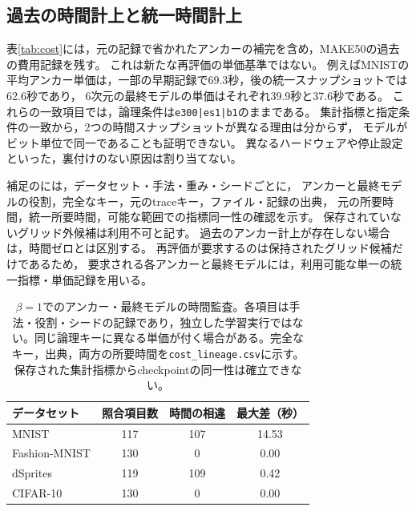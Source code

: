 \documentclass[11pt,a4paper]{ltjsarticle}
\begin{document}
\subsection{過去の時間計上と統一時間計上}\label{app:timing}
表\ref{tab:cost}には，元の記録で省かれたアンカーの補完を含め，MAKE50の過去の費用記録を残す。
これは新たな再評価の単価基準ではない。
例えばMNISTの平均アンカー単価は，一部の早期記録で69.3秒，後の統一スナップショットでは62.6秒であり，
6次元の最終モデルの単価はそれぞれ39.9秒と37.6秒である。
これらの一致項目では，論理条件は\texttt{e300|es1|b1}のままである。
集計指標と指定条件の一致から，2つの時間スナップショットが異なる理由は分からず，
モデルがビット単位で同一であることも証明できない。
異なるハードウェアや停止設定といった，裏付けのない原因は割り当てない。

補足のには，データセット・手法・重み・シードごとに，
アンカーと最終モデルの役割，完全なキー，元のtraceキー，ファイル・記録の出典，
元の所要時間，統一所要時間，可能な範囲での指標同一性の確認を示す。
保存されていないグリッド外候補は利用不可と記す。
過去のアンカー計上が存在しない場合は，時間ゼロとは区別する。
再評価が要求するのは保持されたグリッド候補だけであるため，
要求される各アンカーと最終モデルには，利用可能な単一の統一指標・単価記録を用いる。
\begin{table}[H]
\caption{$\beta=1$でのアンカー・最終モデルの時間監査。各項目は手法・役割・シードの記録であり，独立した学習実行ではない。同じ論理キーに異なる単価が付く場合がある。完全なキー，出典，両方の所要時間を\texttt{cost\_lineage.csv}に示す。保存された集計指標からcheckpointの同一性は確立できない。}\label{tab:timing_audit}
\small
\setlength{\tabcolsep}{3pt}
\begin{tabular*}{\textwidth}{@{\extracolsep{\fill}}lccc@{}}
\toprule
データセット & 照合項目数 & 時間の相違 & 最大差（秒） \\
\midrule
MNIST & 117 & 107 & 14.53 \\
Fashion-MNIST & 130 & 0 & 0.00 \\
dSprites & 119 & 109 & 0.42 \\
CIFAR-10 & 130 & 0 & 0.00 \\
\bottomrule\end{tabular*}
\end{table}
\end{document}
